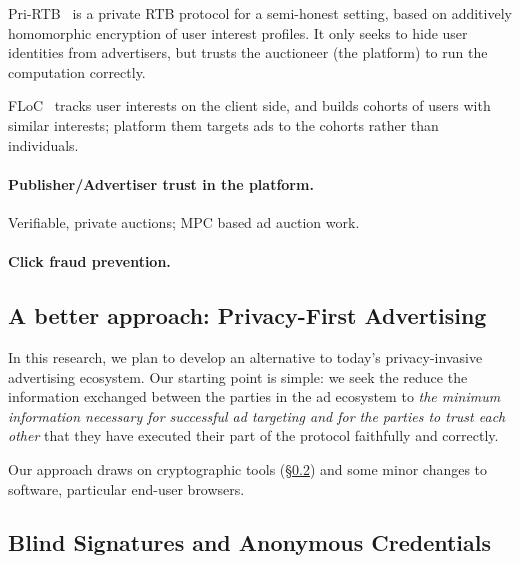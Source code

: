 Pri-RTB~\cite{pri-rtb} is a private RTB protocol for a semi-honest setting,
based on additively homomorphic encryption of user interest profiles.
%
It only seeks to hide user identities from advertisers, but trusts the
auctioneer (the platform) to run the computation correctly.
%

%
FLoC~\cite{floc} tracks user interests on the client side, and builds cohorts of
users with similar interests; platform them targets ads to the cohorts rather
than individuals.
%

\paragraph{Publisher/Advertiser trust in the platform.}

%
Verifiable, private auctions; MPC based ad auction work.
%

\paragraph{Click fraud prevention.}
%
%

\subsection{A better approach: Privacy-First Advertising}

%
In this research, we plan to develop an alternative to today's privacy-invasive
advertising ecosystem.
%
Our starting point is simple: we seek the reduce the information exchanged
between the parties in the ad ecosystem to \emph{the minimum information
necessary for successful ad targeting and for the parties to trust each other}
that they have executed their part of the protocol faithfully and correctly.
%

%
Our approach draws on cryptographic tools (\S\ref{s:bg-crypto}) and some minor
changes to software, particular end-user browsers.

\subsection{Blind Signatures and Anonymous Credentials}
\label{s:bg-crypto}

